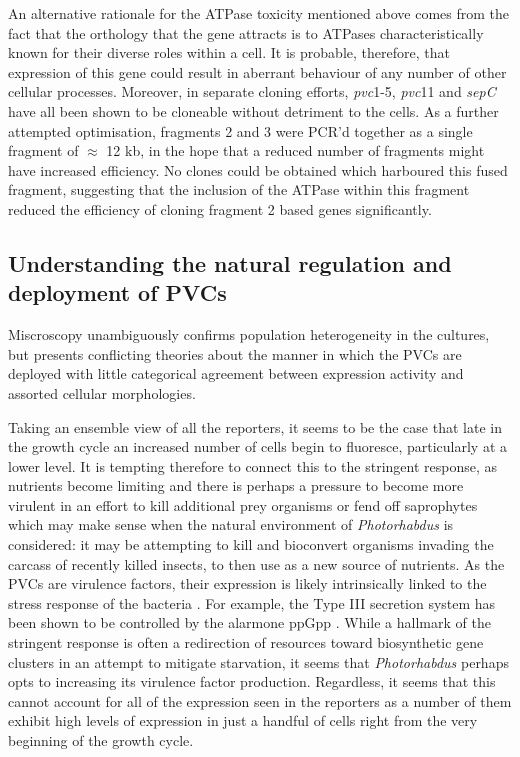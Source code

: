 An alternative rationale for the ATPase toxicity mentioned above comes from the fact that the orthology that the gene attracts is to ATPases characteristically known for their diverse roles within a cell. It is probable, therefore, that expression of this gene could result in aberrant behaviour of any number of other cellular processes. Moreover, in separate cloning efforts, \emph{pvc}1-5, \emph{pvc}11 and \emph{sepC} have all been shown to be cloneable without detriment to the cells. As a further attempted optimisation, fragments 2 and 3 were PCR'd together as a single fragment of $\approx$ 12 kb, in the hope that a reduced number of fragments might have increased efficiency. No clones could be obtained which harboured this fused fragment, suggesting that the inclusion of the ATPase within this fragment reduced the efficiency of cloning fragment 2 based genes significantly.

\subsection{Understanding the natural regulation and deployment of PVCs}

Miscroscopy unambiguously confirms population heterogeneity in the cultures, but presents conflicting theories about the manner in which the PVCs are deployed with little categorical agreement between expression activity and assorted cellular morphologies.

Taking an ensemble view of all the reporters, it seems to be the case that late in the growth cycle an increased number of cells begin to fluoresce, particularly at a lower level. It is tempting therefore to connect this to the stringent response, as nutrients become limiting and there is perhaps a pressure to become more virulent in an effort to kill additional prey organisms or fend off saprophytes which may make sense when the natural environment of \emph{Photorhabdus} is considered: it may be attempting to kill and bioconvert organisms invading the carcass of recently killed insects, to then use as a new source of nutrients. As the PVCs are virulence factors, their expression is likely intrinsically linked to the stress response of the bacteria \citep{Dalebroux2010, Chatnaparat2015 }. For example, the Type III secretion system has been shown to be controlled by the alarmone ppGpp \citep{Ancona2015}. While a hallmark of the stringent response is often a redirection of resources toward biosynthetic gene clusters in an attempt to mitigate starvation, it seems that \emph{Photorhabdus} perhaps opts to increasing its virulence factor production. Regardless, it seems that this cannot account for all of the expression seen in the reporters as a number of them exhibit high levels of expression in just a handful of cells right from the very beginning of the growth cycle.

